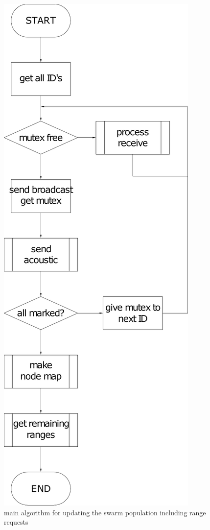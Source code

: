 \documentclass[10pt,a4paper]{article}
\begin{document}
\begin{figure}[H]
   \centering
   \includegraphics[scale=0.45]{mainal.pdf}
   \caption{main algorithm for updating the swarm population including range requests}
   \label{fig:mainal}
\end{figure}
\end{document}
